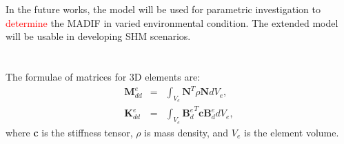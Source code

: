 \documentclass[sensors,article,submit,moreauthors,pdftex]{Definitions/mdpi}
\begin{document}
In the future works, the model will be used for parametric investigation to \textcolor{red}{determine} the MADIF in varied environmental condition. 
The extended model will be usable in developing SHM scenarios.

\appendix


\section{}
\label{app:matrices}
The formulae of matrices for 3D elements are:
\begin{eqnarray}
\textbf{M}_{dd}^e & = & \int_{V_e}\textbf{N}^T\rho \textbf{N} dV_e,\\
\textbf{K}_{dd}^e & = & \int_{V_e}{\textbf{B}_d^e}^T\textbf{c}\textbf{B}_d^edV_e,
\end{eqnarray}
where \textbf{c} is the stiffness tensor, \(\rho\) is mass density, and \(V_e\) is the element volume.
\end{document}
